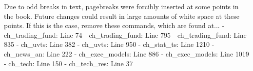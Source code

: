 Due to odd breaks in text, pagebreaks were forcibly inserted at some points in the book. Future changes could result in large amounts of white space at these points. If this is the case, remove these commands, which are found at...
- ch_trading_fund: Line 74
- ch_trading_fund: Line 795
- ch_trading_fund: Line 835
- ch_uvts: Line 382
- ch_uvts: Line 950
- ch_stat_ts: Line 1210
- ch_news_an: Line 222
- ch_exec_models: Line 886
- ch_exec_models: Line 1019
- ch_tech: Line 150
- ch_tech_res: Line 37